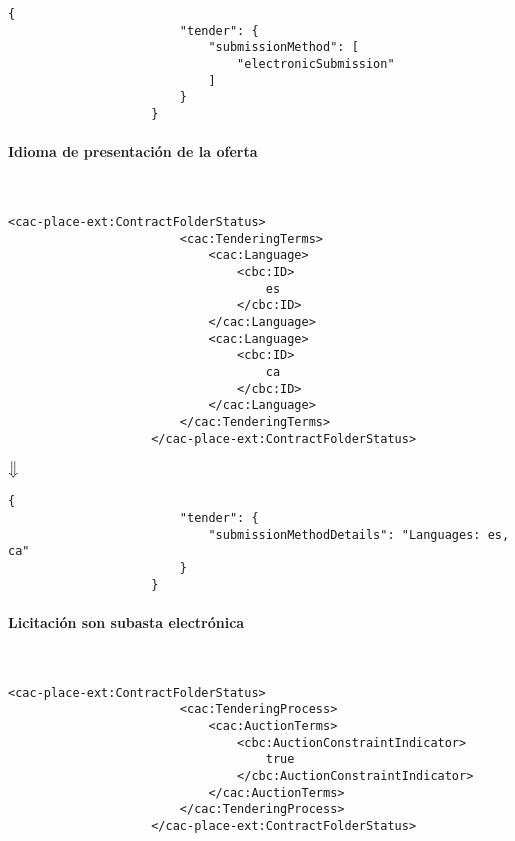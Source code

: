                 \begin{lstlisting}[language=lJSON]
                    {
                        "tender": {
                            "submissionMethod": [
                                "electronicSubmission"
                            ]
                        }
                    }
                \end{lstlisting}
                
            \paragraph{Idioma de presentación de la oferta} \mbox{}\\
                \begin{lstlisting}[language=lXML]
                    <cac-place-ext:ContractFolderStatus>
                        <cac:TenderingTerms>
                            <cac:Language>
                                <cbc:ID>
                                    es
                                </cbc:ID>
                            </cac:Language>
                            <cac:Language>
                                <cbc:ID>
                                    ca
                                </cbc:ID>
                            </cac:Language>
                        </cac:TenderingTerms>
                    </cac-place-ext:ContractFolderStatus>
                \end{lstlisting}
                
                \begin{center}
                    $\big\Downarrow$
                \end{center}
                
                \begin{lstlisting}[language=lJSON]
                    {
                        "tender": {
                            "submissionMethodDetails": "Languages: es, ca"
                        }
                    }
                \end{lstlisting}
                
            \paragraph{Licitación son subasta electrónica} \mbox{}\\
                \begin{lstlisting}[language=lXML]
                    <cac-place-ext:ContractFolderStatus>
                        <cac:TenderingProcess>
                            <cac:AuctionTerms>
                                <cbc:AuctionConstraintIndicator>
                                    true
                                </cbc:AuctionConstraintIndicator>
                            </cac:AuctionTerms>
                        </cac:TenderingProcess>
                    </cac-place-ext:ContractFolderStatus>
                \end{lstlisting}
                
